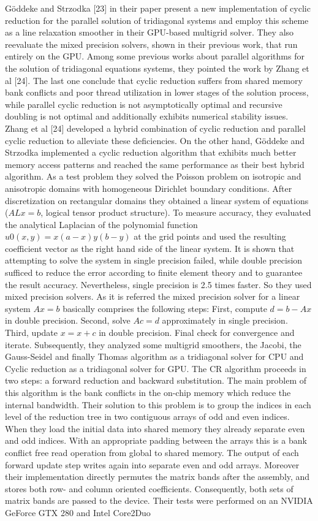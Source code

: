 Göddeke and Strzodka [23] in their paper present a new implementation of cyclic reduction for the parallel solution of tridiagonal systems and employ this scheme as a line relaxation smoother in their GPU-based multigrid solver. They also reevaluate the mixed precision solvers, shown in their previous work, that run entirely on the GPU. Among some previous works about parallel algorithms for the solution of tridiagonal equations systems, they pointed the work by Zhang et al [24]. The last one conclude that cyclic reduction suffers from shared memory bank conflicts and poor thread utilization in lower stages of the solution process, while parallel cyclic reduction is not asymptotically optimal and recursive doubling is not optimal and additionally exhibits numerical stability issues. Zhang et al [24] developed a hybrid combination of cyclic reduction and parallel cyclic reduction to alleviate these deficiencies. On the other hand, Göddeke and Strzodka implemented a cyclic reduction algorithm that exhibits much better memory access patterns and reached the same performance as their best hybrid algorithm. As a test problem they solved the Poisson problem on isotropic and anisotropic domains with homogeneous Dirichlet boundary conditions. After discretization on rectangular domains they obtained a linear system of equations ($ALx = b$, logical tensor product structure). To measure accuracy, they evaluated the analytical Laplacian of the polynomial function $u0(x, y) = x(a-x)y(b-y)$ at the grid points and used the resulting coefficient vector as the right hand side of the linear system. It is shown that attempting to solve the system in single precision failed, while double precision sufficed to reduce the error according to finite element theory and to guarantee the result accuracy. Nevertheless, single precision is 2.5 times faster. So they used mixed precision solvers. As it is referred the mixed precision solver for a linear system $Ax = b$ basically comprises the following steps: First, compute $d = b - Ax$ in double precision. Second, solve $Ac = d$ approximately in single precision. Third, update $x = x + c$ in double precision. Final check for convergence and iterate. Subsequently, they analyzed some multigrid smoothers, the Jacobi, the Gauss-Seidel and finally Thomas algorithm as a tridiagonal solver for CPU and Cyclic reduction as a tridiagonal solver for GPU. The CR algorithm proceeds in two steps: a forward reduction and backward substitution. The main problem of this algorithm is the bank conflicts in the on-chip memory which reduce the internal bandwidth. Their solution to this problem is to group the indices in each level of the reduction tree in two contiguous arrays of odd and even indices. When they load the initial data into shared memory they already separate even and odd indices. With an appropriate padding between the arrays this is a bank conflict free read operation from global to shared memory. The output of each forward update step writes again into separate even and odd arrays. Moreover their implementation directly permutes the matrix bands after the assembly, and stores both row- and column oriented coefficients. Consequently, both sets of matrix bands are passed to the device. Their tests were performed on an NVIDIA GeForce GTX 280 and Intel Core2Duo 